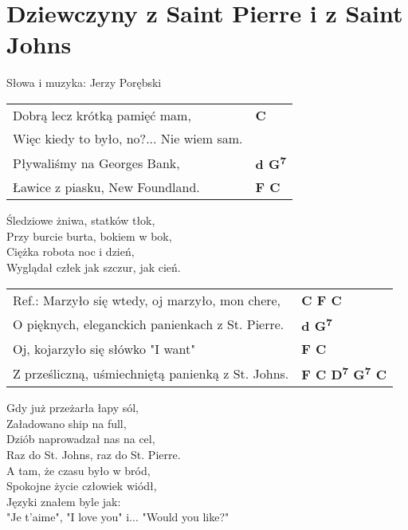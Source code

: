 \section{Dziewczyny z Saint Pierre i z Saint Johns}

Słowa i muzyka: Jerzy Porębski

\vspace{2em}
\begin{tabular}{@{}p{10cm}@{}l@{}}
Dobrą lecz krótką pamięć mam, & \bfseries C\\
Więc kiedy to było, no?... Nie wiem sam. \\
Pływaliśmy na Georges Bank, & \bfseries d G\textsuperscript{7}\\
Ławice z piasku, New Foundland. & \bfseries F C\\
\end{tabular}

\vspace{1em}
Śledziowe żniwa, statków tłok, \\
Przy burcie burta, bokiem w bok, \\
Ciężka robota noc i dzień, \\
Wyglądał człek jak szczur, jak cień. \\

\begin{tabular}{@{}p{10cm}@{}l@{}}
Ref.: Marzyło się wtedy, oj marzyło, mon chere, & \bfseries C F C\\
O pięknych, eleganckich panienkach z St. Pierre. & \bfseries d G\textsuperscript{7}\\
Oj, kojarzyło się słówko "I want" & \bfseries F C\\
Z prześliczną, uśmiechniętą panienką z St. Johns. & \bfseries F C D\textsuperscript{7} G\textsuperscript{7} C\\
\end{tabular}

\vspace{1em}
Gdy już przeżarła łapy sól, \\
Załadowano ship na full, \\
Dziób naprowadzał nas na cel, \\
Raz do St. Johns, raz do St. Pierre. \\

A tam, że czasu było w bród, \\
Spokojne życie człowiek wiódł, \\
Języki znałem byle jak: \\
"Je t'aime", "I love you" i... "Would you like?" \\

